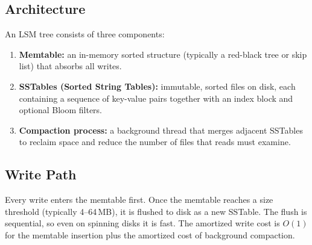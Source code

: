 \subsection{Architecture}

An LSM tree consists of three components:
\begin{enumerate}
    \item \textbf{Memtable:} an in-memory sorted structure (typically a red-black
    tree or skip list) that absorbs all writes.
    \item \textbf{SSTables (Sorted String Tables):} immutable, sorted files on disk,
    each containing a sequence of key-value pairs together with an index block and
    optional Bloom filters.
    \item \textbf{Compaction process:} a background thread that merges adjacent
    SSTables to reclaim space and reduce the number of files that reads must examine.
\end{enumerate}

\subsection{Write Path}

Every write enters the memtable first.  Once the memtable reaches a size threshold
(typically 4--64\,MB), it is flushed to disk as a new SSTable.  The flush is
sequential, so even on spinning disks it is fast.  The amortized write cost is
$O(1)$ for the memtable insertion plus the amortized cost of background compaction.

